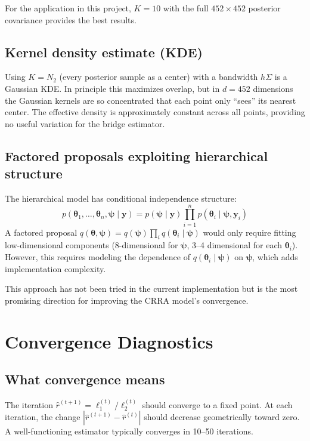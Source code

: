 \documentclass[11pt]{article}
\newcommand{\bth}{\boldsymbol{\theta}}
\newcommand{\bpsi}{\boldsymbol{\psi}}
\newcommand{\by}{\mathbf{y}}
\theoremstyle{plain}
\theoremstyle{definition}
\begin{document}
For the application in this project, $K = 10$ with the full $452 \times 452$
posterior covariance provides the best results.

\subsection{Kernel density estimate (KDE)}

Using $K = N_2$ (every posterior sample as a center) with a bandwidth
$h\Sigma$ is a Gaussian KDE. In principle this maximizes overlap, but in
$d = 452$ dimensions the Gaussian kernels are so concentrated that each
point only ``sees'' its nearest center. The effective density is approximately
constant across all points, providing no useful variation for the bridge
estimator.

\subsection{Factored proposals exploiting hierarchical structure}

The hierarchical model has conditional independence structure:
\begin{equation}
  p(\bth_1, \ldots, \bth_n, \bpsi \mid \by)
  = p(\bpsi \mid \by) \prod_{i=1}^{n} p(\bth_i \mid \bpsi, \by_i)
\end{equation}
A factored proposal $q(\bth, \bpsi) = q(\bpsi) \prod_i q(\bth_i \mid \bpsi)$
would only require fitting low-dimensional components (8-dimensional for
$\bpsi$, 3--4 dimensional for each $\bth_i$). However, this requires
modeling the dependence of $q(\bth_i \mid \bpsi)$ on $\bpsi$, which adds
implementation complexity.

This approach has not been tried in the current implementation but is the
most promising direction for improving the CRRA model's convergence.


\section{Convergence Diagnostics}

\subsection{What convergence means}

The iteration $\hat{r}^{(t+1)} = \ell_1^{(t)} / \ell_2^{(t)}$ should
converge to a fixed point. At each iteration, the change
$|\hat{r}^{(t+1)} - \hat{r}^{(t)}|$ should decrease geometrically toward
zero. A well-functioning estimator typically converges in 10--50 iterations.
\end{document}
